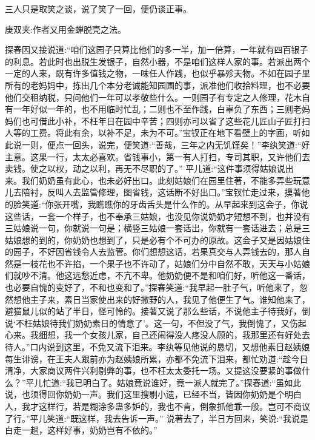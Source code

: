 \begin{parag}
    三人只是取笑之谈，说了笑了一回，便仍谈正事。\begin{note}庚双夹:作者又用金蝉脱壳之法。\end{note}探春因又接说道:“咱们这园子只算比他们的多一半，加一倍算，一年就有四百银子的利息。若此时也出脱生发银子，自然小器，不是咱们这样人家的事。若派出两个一定的人来，既有许多值钱之物，一味任人作践，也似乎暴殄天物。不如在园子里所有的老妈妈中，拣出几个本分老诚能知园圃的事，派准他们收拾料理，也不必要他们交租纳税，只问他们一年可以孝敬些什么。一则园子有专定之人修理，花木自有一年好似一年的，也不用临时忙乱；二则也不至作践，白辜负了东西；三则老妈妈们也可借此小补，不枉年日在园中辛苦；四则亦可以省了这些花儿匠山子匠打扫人等的工费。将此有余，以补不足，未为不可。”宝钗正在地下看壁上的字画，听如此说一则，便点一回头，说完，便笑道:“善哉，三年之内无饥馑矣！”李纨笑道:“好主意。这果一行，太太必喜欢。省钱事小，第一有人打扫，专司其职，又许他们去卖钱。使之以权，动之以利，再无不尽职的了。” 平儿道:“这件事须得姑娘说出来。我们奶奶虽有此心，也未必好出口。此刻姑娘们在园里住著，不能多弄些玩意儿去陪衬，反叫人去监管修理，图省钱，这话断不好出口。”宝钗忙走过来，摸著他的脸笑道:“你张开嘴，我瞧瞧你的牙齿舌头是什么作的。从早起来到这会子，你说这些话，一套一个样子，也不奉承三姑娘，也没见你说奶奶才短想不到，也并没有三姑娘说一句，你就说一句是；横竖三姑娘一套话出，你就有一套话进去；总是三姑娘想的到的，你奶奶也想到了，只是必有个不可办的原故。这会子又是因姑娘住的园子，不好因省钱令人去监管。你们想想这话，若果真交与人弄钱去的，那人自然是一枝花也不许掐，一个果子也不许动了，姑娘们分中自然不敢，天天与小姑娘们就吵不清。他这远愁近虑，不亢不卑。他奶奶便不是和咱们好，听他这一番话，也必要自愧的变好了，不和也变和了。”探春笑道:“我早起一肚子气，听他来了，忽然想他主子来，素日当家使出来的好撒野的人，我见了他便生了气。谁知他来了，避猫鼠儿似的站了半日，怪可怜的。接著又说了那么些话，不说他主子待我好，倒说‘不枉姑娘待我们奶奶素日的情意了’。这一句，不但没了气，我倒愧了，又伤起心来。我细想，我一个女孩儿家，自己还闹得没人疼没人顾的，我那里还有好处去待人。”口内说到这里，不免又流下泪来。李纨等见他说的恳切，又想他素日赵姨娘每生诽谤，在王夫人跟前亦为赵姨娘所累，亦都不免流下泪来，都忙劝道:“趁今日清净，大家商议两件兴利剔弊的事，也不枉太太委托一场。又提这没要紧的事做什么？”平儿忙道:“我已明白了。姑娘竟说谁好，竟一派人就完了。”探春道:“虽如此说，也须得回你奶奶一声。我们这里搜剔小遗，已经不当，皆因你奶奶是个明白人，我才这样行，若是糊涂多蛊多妒的，我也不肯，倒象抓他乖一般。岂可不商议了行。”平儿笑道:“既这样，我去告诉一声。” 说著去了，半日方回来，笑说:“我说是白走一趟，这样好事，奶奶岂有不依的。”
\end{parag}


